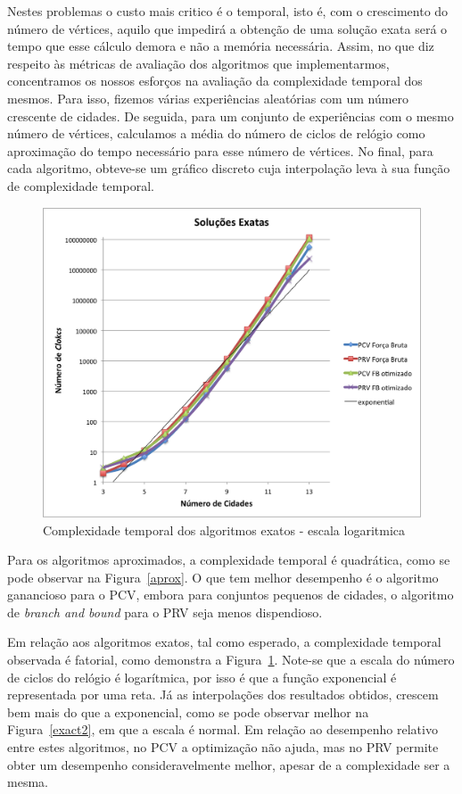 \documentclass[12pt,a4paper,reqno]{report}
\numberwithin{equation}{section}
\begin{document}
Nestes problemas o custo mais critico é o temporal, isto é, com o crescimento do número de vértices, aquilo que impedirá a obtenção de uma solução exata será o tempo que esse cálculo demora e não a memória necessária. Assim, no que diz respeito às métricas de avaliação dos algoritmos que implementarmos, concentramos os nossos esforços na avaliação da complexidade temporal dos mesmos. Para isso, fizemos várias experiências aleatórias com um número crescente de cidades. De seguida, para um conjunto de experiências com o mesmo número de vértices, calculamos a média do número de ciclos de relógio como aproximação do tempo necessário para esse número de vértices. No final, para cada algoritmo, obteve-se um gráfico discreto cuja interpolação leva à sua função de complexidade temporal.

\begin{figure} [ht]
\begin{center}
\includegraphics[width=15cm]{exact.png}
\caption{Complexidade temporal dos algoritmos exatos - escala logaritmica}
\label{exact}
\end{center}
\end{figure}

Para os algoritmos aproximados, a complexidade temporal é quadrática, como se pode observar na Figura~\ref{aprox}. O que tem melhor desempenho é o algoritmo ganancioso para o PCV, embora para conjuntos pequenos de cidades, o algoritmo de \emph{branch and bound} para o PRV seja menos dispendioso.


Em relação aos algoritmos exatos, tal como esperado, a complexidade temporal observada é fatorial, como demonstra a Figura~\ref{exact}. Note-se que a escala do número de ciclos do relógio é logarítmica, por isso é que a função exponencial é representada por uma reta. Já as interpolações dos resultados obtidos, crescem bem mais do que a exponencial, como se pode observar melhor na Figura~\ref{exact2}, em que a escala é normal. Em relação ao desempenho relativo entre estes algoritmos, no PCV a optimização não ajuda, mas no PRV permite obter um desempenho consideravelmente melhor, apesar de a complexidade ser a mesma.
\end{document}

